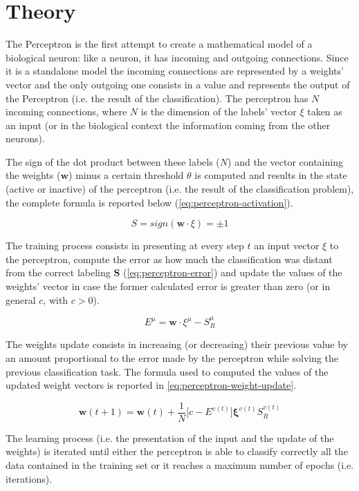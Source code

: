\section{Theory}
\label{sec:fundamentals}
The Perceptron is the first attempt to create a mathematical model of a biological neuron:
like a neuron, it has incoming and outgoing connections.
Since it is a standalone model the incoming connections are represented by a weights' vector and the only outgoing one consists in a value and represents the output of the Perceptron (i.e. the result of the classification).
The perceptron has $N$ incoming connections, where $N$ is the dimension of the labels' vector $\xi$ taken as an input (or in the biological context the information coming from the other neurons).

The sign of the dot product between these labels ($N$) and the vector containing the weights ($\mathsf{\bm{w}}$) minus a certain threshold $\theta$ is computed and results in the state (active or inactive) of the perceptron (i.e. the result of the classification problem), the complete formula is reported below (\cref{eq:perceptron-activation}).

\begin{equation}
    S = sign(\mathsf{\bm{w}} \cdotp \xi) = \pm 1
    \label{eq:perceptron-activation}
\end{equation}

The training process consists in presenting at every step $t$ an input vector $\xi$ to the perceptron, compute the error as how much the classification was distant from the correct labeling $\bm{S}$ (\cref{eq:perceptron-error}) and update the values of the weights' vector in case the former calculated error is greater than zero (or in general $c$, with $c > 0$).

\begin{equation}
    \label{eq:perceptron-error}
    E^\mu = \mathsf{\bm{w}} \cdotp \xi^\mu - S^\mu_R
\end{equation}

The weights update consists in increasing (or decreasing) their previous value by an amount proportional to the error made by the perceptron while solving the previous classification task.
The formula used to computed the values of the updated weight vectors is reported in \cref{eq:perceptron-weight-update}.

\begin{equation}
    \label{eq:perceptron-weight-update}
    \mathsf{\bm{w}}(t+1) = \mathsf{\bm{w}}(t) + \frac{1}{N} \big[c - E^{v(t)}\big] \bm{\xi}^{v(t)} S^{v(t)}_R
\end{equation}

The learning process (i.e. the presentation of the input and the update of the weights) is iterated until either the perceptron is able to classify correctly all the data contained in the training set or it reaches a maximum number of epochs (i.e. iterations).
